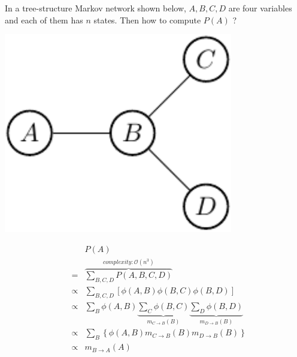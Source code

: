 In a tree-structure Markov network shown below, $A,B,C,D$ are four variables and each of them has $n$ states. Then how to compute $P(A)$ ?
\newline 
\begin{minipage}[c]{0.4\textwidth}
      \centering
      \includegraphics[width=0.75\textwidth]{./Figures/message_passing}
\end{minipage}
\begin{minipage}[c]{0.6\textwidth}
 \begin{equation*}
  \begin{array}{rcl}
  & & P(A) \\
  &=& \overbrace{\sum_{B,C,D}P(A,B,C,D)}^{complexity:  \mathcal{O}(n^{3})} \\
  &\propto& \sum_{B,C,D} \left[ \phi(A,B) \phi(B,C) \phi(B,D) \right] \\
  &\propto& \sum_{B}\phi(A,B) \underbrace{\sum_C \phi(B,C)}_{m_{C\rightarrow B}(B)} \underbrace{\sum_D \phi(B,D)}_{m_{D\rightarrow B}(B)}\\ 
  &\propto& \sum_{B} \left\{\phi(A,B) m_{C\rightarrow B}(B) m_{D\rightarrow B}(B) \right\} \\
  &\propto& m_{B\rightarrow A}(A)
  \end{array}
 \end{equation*}
\end{minipage}
\newline 

